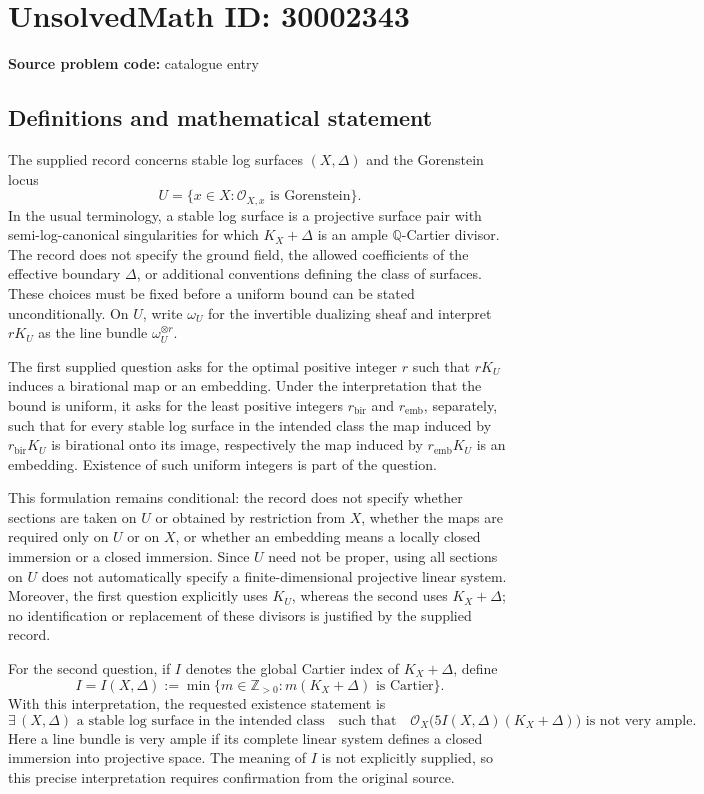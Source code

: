 \documentclass[11pt]{article}
\newcommand{\Z}{\mathbb{Z}}
\newcommand{\Q}{\mathbb{Q}}
\begin{document}
\section*{UnsolvedMath ID: 30002343}
\textbf{Source problem code:} catalogue entry
\subsection{Definitions and mathematical statement}
The supplied record concerns stable log surfaces $(X,\Delta)$ and the Gorenstein locus
\[
U=\{x\in X:\mathcal O_{X,x}\text{ is Gorenstein}\}.
\]
In the usual terminology, a stable log surface is a projective surface pair with semi-log-canonical singularities for which $K_X+\Delta$ is an ample $\Q$-Cartier divisor. The record does not specify the ground field, the allowed coefficients of the effective boundary $\Delta$, or additional conventions defining the class of surfaces. These choices must be fixed before a uniform bound can be stated unconditionally. On $U$, write $\omega_U$ for the invertible dualizing sheaf and interpret $rK_U$ as the line bundle $\omega_U^{\otimes r}$.

The first supplied question asks for the optimal positive integer $r$ such that $rK_U$ induces a birational map or an embedding. Under the interpretation that the bound is uniform, it asks for the least positive integers $r_{\mathrm{bir}}$ and $r_{\mathrm{emb}}$, separately, such that for every stable log surface in the intended class the map induced by $r_{\mathrm{bir}}K_U$ is birational onto its image, respectively the map induced by $r_{\mathrm{emb}}K_U$ is an embedding. Existence of such uniform integers is part of the question.

This formulation remains conditional: the record does not specify whether sections are taken on $U$ or obtained by restriction from $X$, whether the maps are required only on $U$ or on $X$, or whether an embedding means a locally closed immersion or a closed immersion. Since $U$ need not be proper, using all sections on $U$ does not automatically specify a finite-dimensional projective linear system. Moreover, the first question explicitly uses $K_U$, whereas the second uses $K_X+\Delta$; no identification or replacement of these divisors is justified by the supplied record.

For the second question, if $I$ denotes the global Cartier index of $K_X+\Delta$, define
\[
I=I(X,\Delta):=\min\{m\in\Z_{>0}:m(K_X+\Delta)\text{ is Cartier}\}.
\]
With this interpretation, the requested existence statement is
\[
\exists\,(X,\Delta)\text{ a stable log surface in the intended class}
\quad\text{such that}\quad
\mathcal O_X\bigl(5I(X,\Delta)(K_X+\Delta)\bigr)
\text{ is not very ample}.
\]
Here a line bundle is very ample if its complete linear system defines a closed immersion into projective space. The meaning of $I$ is not explicitly supplied, so this precise interpretation requires confirmation from the original source.
\end{document}
